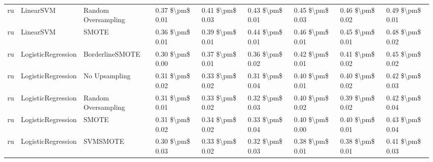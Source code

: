 \begin{tabular}{lllllllll}
      ru &                       LinearSVM &           Random Oversampling & 0.37 \$\textbackslash pm\$ 0.01 &           0.41 \$\textbackslash pm\$ 0.03 &       0.43 \$\textbackslash pm\$ 0.01 &        0.45 \$\textbackslash pm\$ 0.03 &                         0.46 \$\textbackslash pm\$ 0.02 &     0.49 \$\textbackslash pm\$ 0.01 \\
      ru &                       LinearSVM &                         SMOTE & 0.36 \$\textbackslash pm\$ 0.01 &           0.39 \$\textbackslash pm\$ 0.01 &       0.44 \$\textbackslash pm\$ 0.01 &        0.46 \$\textbackslash pm\$ 0.01 &                         0.45 \$\textbackslash pm\$ 0.01 &     0.48 \$\textbackslash pm\$ 0.02 \\
      ru &              LogisticRegression &               BorderlineSMOTE & 0.30 \$\textbackslash pm\$ 0.00 &           0.37 \$\textbackslash pm\$ 0.01 &       0.36 \$\textbackslash pm\$ 0.02 &        0.42 \$\textbackslash pm\$ 0.01 &                         0.41 \$\textbackslash pm\$ 0.02 &     0.45 \$\textbackslash pm\$ 0.02 \\
      ru &              LogisticRegression &                 No Upsampling & 0.31 \$\textbackslash pm\$ 0.02 &           0.33 \$\textbackslash pm\$ 0.02 &       0.31 \$\textbackslash pm\$ 0.04 &        0.40 \$\textbackslash pm\$ 0.01 &                         0.40 \$\textbackslash pm\$ 0.02 &     0.42 \$\textbackslash pm\$ 0.03 \\
      ru &              LogisticRegression &           Random Oversampling & 0.31 \$\textbackslash pm\$ 0.01 &           0.33 \$\textbackslash pm\$ 0.02 &       0.32 \$\textbackslash pm\$ 0.03 &        0.40 \$\textbackslash pm\$ 0.02 &                         0.39 \$\textbackslash pm\$ 0.02 &     0.42 \$\textbackslash pm\$ 0.04 \\
      ru &              LogisticRegression &                         SMOTE & 0.31 \$\textbackslash pm\$ 0.02 &           0.34 \$\textbackslash pm\$ 0.02 &       0.33 \$\textbackslash pm\$ 0.04 &        0.40 \$\textbackslash pm\$ 0.00 &                         0.40 \$\textbackslash pm\$ 0.01 &     0.43 \$\textbackslash pm\$ 0.04 \\
      ru &              LogisticRegression &                      SVMSMOTE & 0.30 \$\textbackslash pm\$ 0.03 &           0.33 \$\textbackslash pm\$ 0.02 &       0.32 \$\textbackslash pm\$ 0.03 &        0.38 \$\textbackslash pm\$ 0.01 &                         0.38 \$\textbackslash pm\$ 0.01 &     0.41 \$\textbackslash pm\$ 0.03 \\

\end{tabular}
